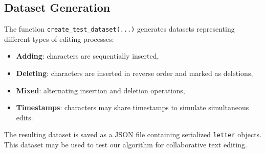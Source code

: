 \subsection{Dataset Generation}

The function \texttt{create\_test\_dataset(...)} generates datasets representing different types of editing processes:
\begin{itemize}
    \item \textbf{Adding}: characters are sequentially inserted,
    \item \textbf{Deleting}: characters are inserted in reverse order and marked as deletions,
    \item \textbf{Mixed}: alternating insertion and deletion operations,
    \item \textbf{Timestamps}: characters may share timestamps to simulate simultaneous edits.
\end{itemize}

The resulting dataset is saved as a JSON file containing serialized \texttt{letter} objects. This dataset may be used to test our algorithm for collaborative text editing.
